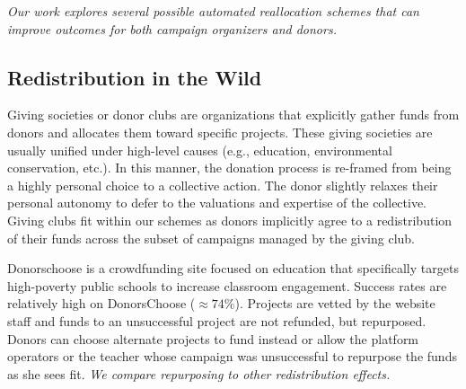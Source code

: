 \textit{Our work explores several possible automated reallocation schemes that can improve outcomes for both campaign organizers and donors.}


\subsection{Redistribution in the Wild}

Giving societies or donor clubs are organizations that explicitly gather funds from donors and allocates them toward specific projects. These giving societies are usually unified under high-level causes (e.g., education, environmental conservation, etc.). In this manner, the donation process is re-framed from being a highly personal choice to a collective action. The donor slightly relaxes their personal autonomy to defer to the valuations and expertise of the collective. Giving clubs fit within our \cpr schemes as donors implicitly agree to a redistribution of their funds across the subset of campaigns managed by the giving club.

 Donorschoose is a crowdfunding site focused on education that specifically targets high-poverty public schools to increase classroom engagement. Success rates are relatively high on DonorsChoose ($\approx 74\%$). Projects are vetted by the website staff and funds to an unsuccessful project are not refunded, but repurposed. Donors can choose alternate projects to fund instead or allow the platform operators or the teacher whose campaign was unsuccessful to repurpose the funds as she sees fit. \textit{We compare repurposing to other redistribution effects.}
 